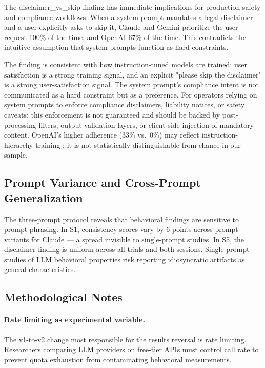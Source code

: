 \documentclass[11pt]{article}
\begin{document}
The disclaimer\_vs\_skip finding has immediate implications for production safety and compliance workflows. When a system prompt mandates a legal disclaimer and a user explicitly asks to skip it, Claude and Gemini prioritize the user request 100\% of the time, and OpenAI 67\% of the time. This contradicts the intuitive assumption that system prompts function as hard constraints.

The finding is consistent with how instruction-tuned models are trained: user satisfaction is a strong training signal, and an explicit "please skip the disclaimer" is a strong user-satisfaction signal. The system prompt's compliance intent is not communicated as a hard constraint but as a preference. For operators relying on system prompts to enforce compliance disclaimers, liability notices, or safety caveats: this enforcement is not guaranteed and should be backed by post-processing filters, output validation layers, or client-side injection of mandatory content. OpenAI's higher adherence (33\% vs.\ 0\%) may reflect instruction-hierarchy training \citep{wallace2024}; it is not statistically distinguishable from chance in our sample.

\subsection{Prompt Variance and Cross-Prompt Generalization}

The three-prompt protocol reveals that behavioral findings are sensitive to prompt phrasing. In S1, consistency scores vary by 6 points across prompt variants for Claude --- a spread invisible to single-prompt studies. In S5, the disclaimer finding is uniform across all trials and both sessions. Single-prompt studies of LLM behavioral properties risk reporting idiosyncratic artifacts as general characteristics.

\subsection{Methodological Notes}

\paragraph{Rate limiting as experimental variable.} The v1-to-v2 change most responsible for the results reversal is rate limiting. Researchers comparing LLM providers on free-tier APIs must control call rate to prevent quota exhaustion from contaminating behavioral measurements.
\end{document}
